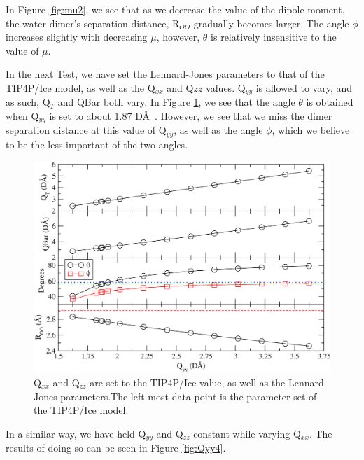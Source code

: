 In Figure \ref{fig:mu2}, we see that as we decrease the value of the dipole 
moment, the water dimer's separation distance, R$_{OO}$ gradually becomes 
larger. The angle $\phi$ increases slightly with decreasing $\mu$, however, 
$\theta$ is relatively insensitive to the value of $\mu$.
 
In the next Test, we have set the Lennard-Jones parameters to that of the
TIP4P/Ice model, as well as the Q$_{xx}$ and Q${zz}$ values. Q$_{yy}$ is 
allowed to vary, and as such, Q$_T$ and QBar both vary. In Figure
\ref{fig:Qyy3}, we see that the angle $\theta$ is obtained when Q$_{yy}$
is set to about 1.87 D\AA~. However, we see that we miss the dimer 
separation distance at this value of Q$_{yy}$, as well as the angle
$\phi$, which we believe to be the less important of the two angles.

\begin{figure}[h!]
\includegraphics[width=\linewidth]{Figures/Test23_plot.pdf}
\caption{\label{fig:Qyy3} Q$_{xx}$ and Q$_{zz}$ are set to the TIP4P/Ice value, as well as the Lennard-Jones parameters.The left most data point is the parameter set of the TIP4P/Ice model.}
\end{figure}

In a similar way, we have held Q$_{yy}$ and Q$_{zz}$ constant while varying
Q$_{xx}$. The results of doing so can be seen in Figure \ref{fig:Qyy4}.

